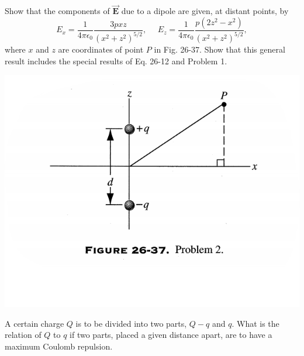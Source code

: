 \documentclass[12pt,letterpaper,boxed,cm]{hmcpset}
\newcommand{\f}[2]{\frac{#1}{#2}}
\begin{document}
\begin{problem}[26-P2]
Show that the components of $\vec{\mathbf{E}}$ due to a dipole are given, at distant
points, by
\[
  E_x = \f{1}{4\pi\epsilon_0} \f{3pxz}{(x^2+z^2)^{5/2}}, ~~~~~~ E_z = \f{1}{4\pi\epsilon_0} \f{p(2z^2-x^2)}{(x^2+z^2)^{5/2}},
\]
where $x$ and $z$ are coordinates of point $P$ in Fig. 26-37. Show that
this general result includes the special results of Eq. 26-12 and Problem 1.
\begin{center}
  \includegraphics[scale=0.7]{03.png}
\end{center}
\end{problem}
\begin{solution}
\end{solution}
\newpage 

\begin{problem}[25-P7*]
A certain charge $Q$ is to be divided into two parts, $Q-q$ and $q$. What is the relation of $Q$ to $q$ if two parts, placed a given distance apart, are to have a maximum Coulomb repulsion.
\end{problem}
\begin{solution}
\end{solution}
\end{document}
